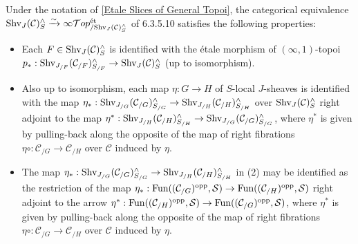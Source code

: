 \documentclass[10pt]{article}
\newcommand{\mS}{\mathcal S}
\newcommand{\C}{\mathcal C}
\newcommand{\cT}{\mathcal{T}}
\theoremstyle{witharg}
\theoremstyle{witharg}
\theoremstyle{witharg2}
\begin{document}
\begin{remark}{}\label{Etale Morphisms Section Summary Remark}

    Under the notation of \ref{Etale Slices of General Topoi}, the categorical equivalence $\textnormal{Shv}_J(\C)_S^\wedge\xrightarrow{\sim}\infty\cT op^{\textnormal{\'{e}t}}_{/\textnormal{Shv}_J(\C)_S^\wedge}$ of  6.3.5.10 satisfies the following properties: 

    \begin{itemize}

        \item [$(1)$] Each $F\in \textnormal{Shv}_J(\C)_S^\wedge$ is identified with the \'{e}tale morphism of $(\infty,1)$-topoi $p_*:\textnormal{Shv}_{J_{/F}}(\C_{/F})^\wedge_{S_{/F}}\rightarrow \textnormal{Shv}_J(\C)^\wedge_S$ (up to isomorphism).

        \item [$(2)$] Also up to isomorphism, each map $\eta:G\rightarrow H$ of $S$-local $J$-sheaves is identified with the map $\eta_*:\textnormal{Shv}_{J_{/G}}(\C_{/G})^\wedge_{S_{/G}}\rightarrow \textnormal{Shv}_{J_{/H}}(\C_{/H})^\wedge_{S_{/H}}$ over $\textnormal{Shv}_J(\C)^\wedge_S$ right adjoint to the map $\eta^*:\textnormal{Shv}_{J_{/H}}(\C_{/H})^\wedge_{S_{/H}}\rightarrow \textnormal{Shv}_{J_{/G}}(\C_{/G})^\wedge_{S_{/G}}$, where $\eta^*$ is given by pulling-back along the opposite of the map of right fibrations $\eta\circ:\C_{/G}\rightarrow \C_{/H}$ over $\C$ induced by $\eta$. 

        \item [(3)] The map $\eta_*:\textnormal{Shv}_{J_{/G}}(\C_{/G})^\wedge_{S_{/G}}\rightarrow \textnormal{Shv}_{J_{/H}}(\C_{/H})^\wedge_{S_{/H}}$ in (2) may be identified as the restriction of the map $\eta_*:\textnormal{Fun}((\C_{/G})^{\textnormal{opp}},\mS)\rightarrow \textnormal{Fun}((\C_{/H})^{\textnormal{opp}},\mS)$ right adjoint to the arrow $\eta^*:\textnormal{Fun}((\C_{/H})^{\textnormal{opp}},\mS)\rightarrow \textnormal{Fun}((\C_{/G})^{\textnormal{opp}},\mS)$, where $\eta^*$ is given by pulling-back along the opposite of the map of right fibrations $\eta\circ:\C_{/G}\rightarrow \C_{/H}$ over $\C$ induced by $\eta$.

    \end{itemize}



    
\end{remark}
\end{document}
